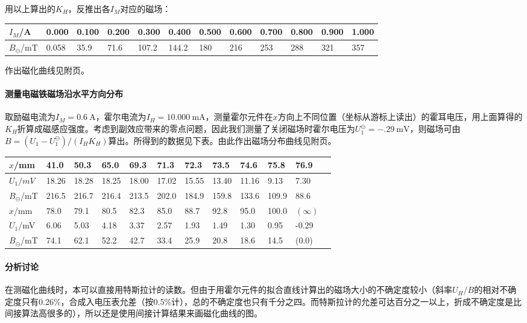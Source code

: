 \documentclass[UTF8]{ctexart}
\begin{document}
用以上算出的$K_H$，反推出各$I_M$对应的磁场：
\begin{center}\begin{tabu}to\linewidth{X[c]|X[c]X[c]X[c]X[c]X[c]X[c]X[c]X[c]X[c]X[c]X[c]}
  \hline
$I_M$/A	&0.000 &0.100 &0.200 &0.300 &0.400 &0.500 &0.600 &0.700 &0.800 &0.900 &1.000\\
\hline
$B_\ominus$/mT	&0.058 &35.9 &71.6 &107.2 &144.2 &180 &216 &253 &288 &321 &357\\
  \hline
\end{tabu}\end{center}
作出磁化曲线见附页。
\paragraph{测量电磁铁磁场沿水平方向分布}
取励磁电流为$I_M=\SI{0.6}{\A}$，霍尔电流为$I_H=\SI{10.000}{\mA}$，测量霍尔元件在$x$方向上不同位置（坐标从游标上读出）的霍耳电压，用上面算得的$K_H$折算成磁感应强度。考虑到副效应带来的零点问题，因此我们测量了关闭磁场时霍尔电压为$U_1^{\ominus}=\SI{-.29}{\mV}$，则磁场可由$B=(U_1-U_1^{\ominus})/(I_HK_H)$算出。所得到的数据见下表。由此作出磁场分布曲线见附页。
\begin{center}\begin{tabu}to\linewidth{X[c]|X[c]X[c]X[c]X[c]X[c]X[c]X[c]X[c]X[c]X[c]X[c]}
  \hline
$x$/mm	&41.0 &50.3 &65.0 &69.3 &71.3 &72.3 &73.5 &74.6 &75.8 &76.9\\
\hline
$U_1/mV$	&18.26 &18.28 &18.25 &18.00 &17.02 &15.55 &13.40 &11.16 &9.13 &7.30\\
$B_\ominus$/mT	&216.5 &216.7 &216.4 &213.5 &202.0 &184.9 &159.8 &133.6 &109.9 &88.6 \\
  \hline\hline
$x$/mm&78.0 &79.1 &80.5 &82.3 &85.0 &88.7 &92.8 &95.0 &100.0 &$(\infty)$\\
\hline
$U_1$/mV	&6.06 &5.03 &4.18 &3.37 &2.57 &1.93 &1.49 &1.30 &0.95	&-0.29 \\
$B_\ominus$/mT	&74.1 &62.1 &52.2 &42.7 &33.4 &25.9 &20.8 &18.6 &14.5 &(0.0)\\
\hline
\end{tabu}\end{center}
\paragraph{分析讨论}
在测磁化曲线时，本可以直接用特斯拉计的读数。但由于用霍尔元件的拟合直线计算出的磁场大小的不确定度较小（斜率$U_H/B$的相对不确定度只有0.26\%，合成入电压表允差（按0.5\%计），总的不确定度也只有千分之四。而特斯拉计的允差可达百分之一以上，折成不确定度是比间接算法高很多的），所以还是使用间接计算结果来画磁化曲线的图。
\end{document}
